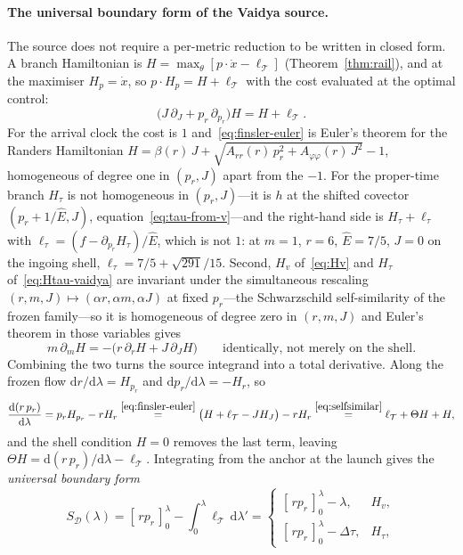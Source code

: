 \documentclass[12pt]{iopart}
\newcommand{\Ehat}{\hat E}
\newcommand{\dd}{\mathrm{d}}
\theoremstyle{plain}
\theoremstyle{definition}
\theoremstyle{plain}
\theoremstyle{remark}
\begin{document}
\paragraph{The universal boundary form of the Vaidya source.} The source does not
require a per-metric reduction to be written in closed form. A branch Hamiltonian is
$H=\max_\theta[p\cdot\dot x-\ell_{\mathcal T}]$ (Theorem~\ref{thm:rail}), and at the
maximiser $H_p=\dot x$, so $p\cdot H_p=H+\ell_{\mathcal T}$ with the cost evaluated at the
optimal control:
\begin{equation}
    \big(J\,\partial_J+p_r\,\partial_{p_r}\big)H=H+\ell_{\mathcal T} .
    \label{eq:finsler-euler}
\end{equation}
For the arrival clock the cost is $1$ and~\eqref{eq:finsler-euler} is Euler's theorem for
the Randers Hamiltonian
$H=\beta(r)\,J+\sqrt{A_{rr}(r)\,p_r^2+A_{\varphi\varphi}(r)\,J^2}-1$, homogeneous of degree
one in $(p_r,J)$ apart from the $-1$. For the proper-time branch $H_\tau$ is not
homogeneous in $(p_r,J)$---it is $h$ at the shifted covector $(p_r+1/\Ehat,J)$,
equation~\eqref{eq:tau-from-v}---and the right-hand side is $H_\tau+\ell_\tau$ with
$\ell_\tau=(f-\partial_{p_r}H_\tau)/\Ehat$, which is not $1$: at $m=1$, $r=6$, $\Ehat=7/5$,
$J=0$ on the ingoing shell, $\ell_\tau=7/5+\sqrt{291}/15$.
Second, $H_v$ of~\eqref{eq:Hv} and $H_\tau$ of~\eqref{eq:Htau-vaidya} are invariant under the simultaneous rescaling
$(r,m,J)\mapsto(\alpha r,\alpha m,\alpha J)$ at fixed $p_r$---the Schwarzschild
self-similarity of the frozen family---so it is homogeneous of degree zero in $(r,m,J)$ and
Euler's theorem in those variables gives
\begin{equation}
    m\,\partial_m H=-\big(r\,\partial_r H+J\,\partial_J H\big)
    \qquad\text{identically, not merely on the shell.}
    \label{eq:selfsimilar}
\end{equation}
Combining the two turns the source integrand into a total derivative. Along the frozen
flow $\dd r/\dd\lambda=H_{p_r}$ and $\dd p_r/\dd\lambda=-H_r$, so
\[
   \frac{\dd (r\,p_r)}{\dd\lambda}=p_r H_{p_r}-r H_r
   \overset{\eqref{eq:finsler-euler}}{=}\big(H+\ell_{\mathcal T}-J H_J\big)-r H_r
   \overset{\eqref{eq:selfsimilar}}{=}\ell_{\mathcal T}+\Theta H+H ,
\]
and the shell condition $H=0$ removes the last term, leaving
$\Theta H=\dd(r\,p_r)/\dd\lambda-\ell_{\mathcal T}$. Integrating from the anchor at the
launch gives the \emph{universal boundary form}
\begin{equation}
    S_{\mathcal D}(\lambda)=[\,rp_r\,]_0^{\lambda}-\int_0^\lambda\ell_{\mathcal T}\,\dd\lambda'
    =\begin{cases}[\,rp_r\,]_0^{\lambda}-\lambda, & H_v,\\[1pt]
    [\,rp_r\,]_0^{\lambda}-\Delta\tau, & H_\tau,\end{cases}
    \label{eq:SD-vaidya}
\end{equation}
\end{document}
